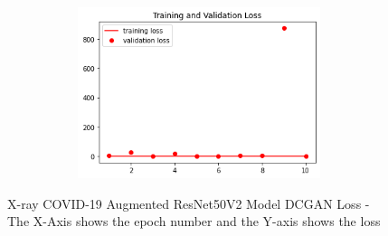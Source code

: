  \begin{figure}[H]
    \centering
    \includegraphics[width=1\textwidth,height=5cm,keepaspectratio]{Images/ResNet50V2BaselineTrainingValidationLossXRayCOVID19AugmentedDCGAN.png}\\
    \caption{X-ray COVID-19 Augmented ResNet50V2 Model DCGAN Loss - The X-Axis shows the epoch number and the Y-axis shows the loss}
    \label{fig:X-ray COVID-19 Augmented ResNet50V2 Model DCGAN Loss}
\end{figure}
